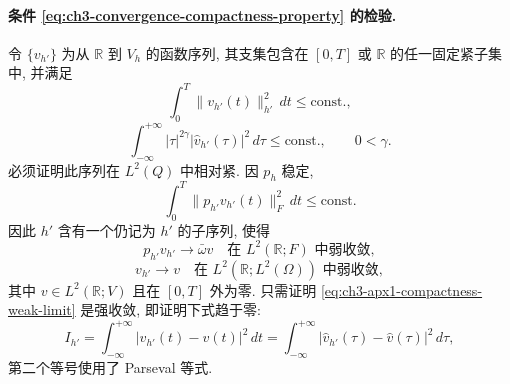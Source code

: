 \paragraph{条件 \eqref{eq:ch3-convergence-compactness-property} 的检验.}
令 $\{v_{h'}\}$ 为从 $\mathbb R$ 到 $V_h$ 的函数序列, 其支集包含在 $[0,T]$ 或 $\mathbb R$ 的任一固定紧子集中, 并满足
\begin{equation}
\int_0^T\lVert v_{h'}(t)\rVert_{h'}^2\,dt\leq\mathrm{const.},
\label{eq:ch3-apx1-compactness-energy}
\end{equation}
\begin{equation}
\int_{-\infty}^{+\infty}|\tau|^{2\gamma}|\widehat v_{h'}(\tau)|^2\,d\tau
\leq\mathrm{const.},\qquad 0<\gamma.
\label{eq:ch3-apx1-compactness-fourier}
\end{equation}
必须证明此序列在 $L^2(Q)$ 中相对紧. 因 $p_h$ 稳定,
\begin{equation}
\int_0^T\lVert p_{h'}v_{h'}(t)\rVert_F^2\,dt\leq\mathrm{const.}
\label{eq:ch3-apx1-compactness-ph}
\end{equation}
因此 $h'$ 含有一个仍记为 $h'$ 的子序列, 使得
\begin{equation}
p_{h'}v_{h'}\to\bar\omega v\quad\text{在 $L^2(\mathbb R;F)$ 中弱收敛},
\label{eq:ch3-apx1-compactness-image-limit}
\end{equation}
\begin{equation}
v_{h'}\to v\quad\text{在 $L^2(\mathbb R;L^2(\Omega))$ 中弱收敛},
\label{eq:ch3-apx1-compactness-weak-limit}
\end{equation}
其中 $v\in L^2(\mathbb R;V)$ 且在 $[0,T]$ 外为零. 只需证明 \eqref{eq:ch3-apx1-compactness-weak-limit} 是强收敛, 即证明下式趋于零:
\begin{equation}
I_{h'}=\int_{-\infty}^{+\infty}|v_{h'}(t)-v(t)|^2\,dt
=\int_{-\infty}^{+\infty}|\widehat v_{h'}(\tau)-\widehat v(\tau)|^2\,d\tau,
\label{eq:ch3-apx1-compactness-parseval}
\end{equation}
第二个等号使用了 Parseval 等式.

